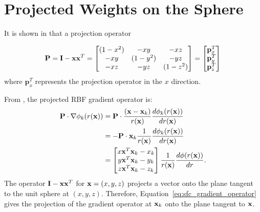 %
% 
%
%


\chapter{Projected Weights on the Sphere} 
\label{app:indirect_weights}



It is shown in \cite{FlyerWright09, FlyerLehto11} that a projection operator

$$ 
\mathbf{P} =  \mathbf{I} - \mathbf{x} \mathbf{x}^{T} = \begin{bmatrix} 
(1 - x^{2}) & -xy & -xz \\ 
-xy & (1 - y^{2}) & -yz \\ 
-xz & -yz & (1-z^{2})
\end{bmatrix} = \begin{bmatrix} \mathbf{p}_{x}^{T} \\ \mathbf{p}_{y}^{T} \\ \mathbf{p}_{z}^{T} \end{bmatrix}
$$
where $\mathbf{p}_{x}^{T}$ represents the projection operator in the $x$ direction. 

From \cite{FlyerWright09}, the projected RBF gradient operator is:
\begin{align}
\mathbf{P} \cdot \nabla \phi_{k}(r(\vx)) & = \mathbf{P} \cdot \frac{(\vx-\vx_{k})}{r(\vx)} \d{\phi_{k}(r(\vx))}{r(\vx)}  \nonumber \\
& = -\mathbf{P} \cdot \vx_{k}\frac{1}{r(\vx)} \d{\phi_{k}(r(\vx))}{r(\vx)}  \nonumber \\ %
& = \begin{bmatrix} x \vx^{T} \vx_{k} - x_{k} \\  y \vx^{T} \vx_{k} - y_{k} \\  z \vx^{T} \vx_{k} - z_{k} \end{bmatrix} \frac{1}{r(\vx)} \d{\phi(r(\vx))}{r} \label{eq:sfc_gradient_operator}.
\end{align}
The operator $\mathbf{I} - \mathbf{x} \mathbf{x}^{T}$ for $\mathbf{x} = (x,y,z)$ projects a vector onto the plane tangent to the unit sphere at $(x,y,z)$. Therefore, Equation~\ref{eq:sfc_gradient_operator} gives the projection of the gradient operator at $\mathbf{x}_{k}$ onto the plane tangent to $\mathbf{x}$. 


